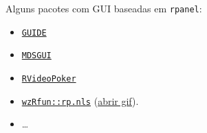 \begin{frame}

  Alguns pacotes com GUI baseadas em \texttt{rpanel}:
  \begin{itemize}
  \item
    \href{http://cran.r-project.org/web/packages/GUIDE/index.html}{\texttt{GUIDE}}
  \item
    \href{http://cran.r-project.org/web/packages/MDSGUI/index.html}{\texttt{MDSGUI}}
  \item
    \href{http://cran.r-project.org/web/packages/RVideoPoker/index.html}{\texttt{RVideoPoker}}
  \item
    \href{https://github.com/walmes/wzRfun/blob/master/R/rp.nls.R}{\texttt{wzRfun::rp.nls}}
    (\href{run:./images/rp-nls.gif}{abrir gif}).
  \item \ldots
  \end{itemize}

\end{frame}
